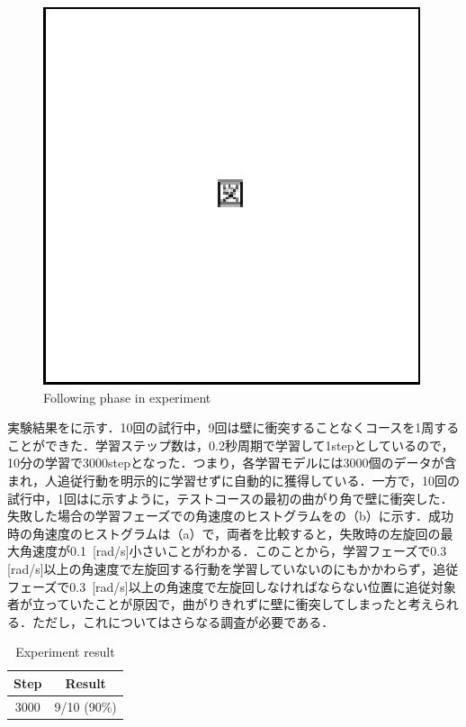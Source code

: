   \begin{figure}[h]
    \centering
    \includegraphics[keepaspectratio, scale=0.80] {images/eps/figure}
    \captionsetup{justification=raggedright} %
    \caption{Following phase in experiment}
    \label{Fig:Following phase in experiment}
  \end{figure}

  実験結果をに示す．10回の試行中，9回は壁に衝突することなくコースを1周することができた．学習ステップ数は，0.2秒周期で学習して1stepとしているので，10分の学習で3000stepとなった．つまり，各学習モデルには3000個のデータが含まれ，人追従行動を明示的に学習せずに自動的に獲得している．一方で，10回の試行中，1回はに示すように，テストコースの最初の曲がり角で壁に衝突した．失敗した場合の学習フェーズでの角速度のヒストグラムをの（b）に示す．成功時の角速度のヒストグラムは（a）で，両者を比較すると，失敗時の左旋回の最大角速度が0.1\, [rad/s]小さいことがわかる．このことから，学習フェーズで0.3\, [rad/s]以上の角速度で左旋回する行動を学習していないのにもかかわらず，追従フェーズで0.3\, [rad/s]以上の角速度で左旋回しなければならない位置に追従対象者が立っていたことが原因で，曲がりきれずに壁に衝突してしまったと考えられる．ただし，これについてはさらなる調査が必要である．

  \begin{table}[h]
    \caption{Experiment result}
    \label{tab:Experiment result}
    \centering
    \begin{tabular}{|c|c|}
    \hline
    Step & Result      \\ \hline
    3000 & 9/10 (90\%) \\ \hline
    \end{tabular}
    \end{table}

